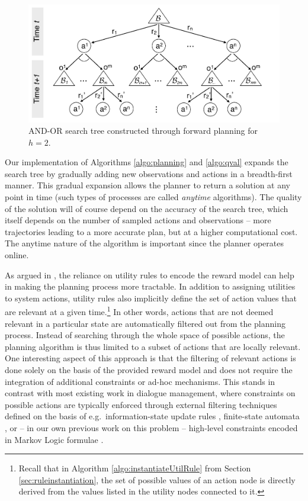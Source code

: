 \begin{figure}[ht!]
\centering
\includegraphics[scale=0.30]{imgs/andortree.pdf}
\caption{AND-OR search tree constructed through forward planning for $h=2$.}
\label{fig:andortree}
\end{figure}

Our implementation of Algorithms \ref{algo:planning} and \ref{algo:qval}  expands the search tree by gradually adding new observations and actions in a breadth-first manner.  This gradual expansion allows the planner to return a solution at any point in time (such types of processes are called \textit{anytime} algorithms). The quality of the solution will of course depend on the accuracy of the search tree, which itself depends on the number of sampled actions and observations -- more trajectories leading to a more accurate plan, but at a higher computational cost.  The anytime nature of the algorithm is important since the planner operates online.

As argued in \cite{onlineplanning-iwsds2012}, the reliance on utility rules to encode the reward model can help in making the planning process more tractable.  In addition to assigning utilities to system actions, utility rules also implicitly define the set of action values that are relevant at a given time.\footnote{Recall that in Algorithm \ref{algo:instantiateUtilRule} from Section \ref{sec:ruleinstantiation}, the set of possible values of an action node is directly derived from the values listed in the utility nodes connected to it.} In other words, actions that are not deemed relevant in a particular state are automatically filtered out from the planning process.  Instead of searching through the whole space of possible actions, the planning algorithm is thus limited to a subset of actions that are locally relevant.  One interesting aspect of this approach is that the filtering of relevant actions is done solely on the basis of the provided reward model and does not require the integration of additional constraints or ad-hoc mechanisms. This stands in contrast with most existing work in dialogue management, where constraints on possible actions are typically enforced through external filtering techniques defined on the basis of e.g.\ information-state update rules \citep{heeman2007}, finite-state automata \citep{williams2008}, or -- in our own previous work on this problem -- high-level constraints encoded in Markov Logic formulae \citep{srw-acl2010}. 

